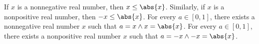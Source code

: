 If \(x\) is a nonnegative real number, then \(x\le\abs{x}\).
Similarly, if \(x\) is a nonpositive real number, then \(-x\le\abs{x}\).
For every \(a\in[0,1]\), there exists a nonnegative real number \(x\) such that
\(a=x \land x=\abs{x}\).
For every \(a\in[0,1]\), there exists a nonpositive real number \(x\) such that
\(a=-x \land -x=\abs{x}\).
